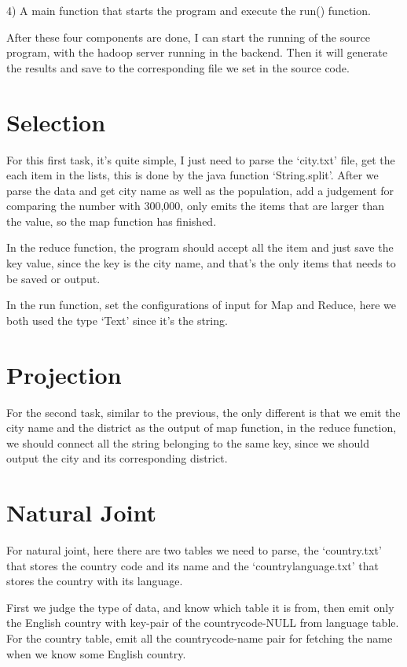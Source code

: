 \documentclass{article}
\begin{document}
4) A main function that starts the program and execute the run() function.

After these four components are done, I can start the running of the source program, with the hadoop server running in the backend. Then it will generate the results and save to the corresponding file we set in the source code.

\section{Selection}

For this first task, it's quite simple, I just need to parse the `city.txt' file, get the each item in the lists, this is done by the java function `String.split'. After we parse the data and get city name as well as the population, add a judgement for comparing the number with 300,000, only emits the items that are larger than the value, so the map function has finished.

In the reduce function, the program should accept all the item and just save the key value, since the key is the city name, and that's the only items that needs to be saved or output.

In the run function, set the configurations of input for Map and Reduce, here we both used the type `Text' since it's the string.

\section{Projection}

For the second task, similar to the previous, the only different is that we emit the city name and the district as the output of map function, in the reduce function, we should connect all the string belonging to the same key, since we should output the city and its corresponding district.


\section{Natural Joint}

For natural joint, here there are two tables we need to parse, the `country.txt' that stores the country code and its name and the `countrylanguage.txt' that stores the country with its language.

First we judge the type of data, and know which table it is from, then emit only the English country with key-pair of the countrycode-NULL from language table. For the country table, emit all the countrycode-name pair for fetching the name when we know some English country. 
\end{document}
